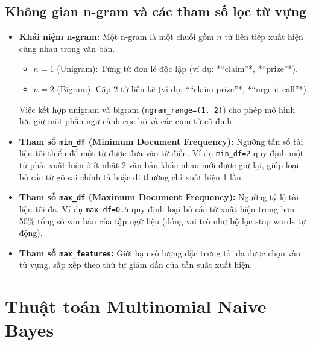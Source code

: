\subsection{Không gian n-gram và các tham số lọc từ vựng}
\begin{itemize}
    \item \textbf{Khái niệm n-gram:} Một n-gram là một chuỗi gồm $n$ từ liên tiếp xuất hiện cùng nhau trong văn bản.
    \begin{itemize}
        \item $n=1$ (Unigram): Từng từ đơn lẻ độc lập (ví dụ: *“claim”*, *“prize”*).
        \item $n=2$ (Bigram): Cặp 2 từ liền kề (ví dụ: *“claim prize”*, *“urgent call”*).
    \end{itemize}
    Việc kết hợp unigram và bigram (\texttt{ngram\_range=(1, 2)}) cho phép mô hình lưu giữ một phần ngữ cảnh cục bộ và các cụm từ cố định.
    \item \textbf{Tham số \texttt{min\_df} (Minimum Document Frequency):} Ngưỡng tần số tài liệu tối thiểu để một từ được đưa vào từ điển. Ví dụ \texttt{min\_df=2} quy định một từ phải xuất hiện ở ít nhất 2 văn bản khác nhau mới được giữ lại, giúp loại bỏ các từ gõ sai chính tả hoặc dị thường chỉ xuất hiện 1 lần.
    \item \textbf{Tham số \texttt{max\_df} (Maximum Document Frequency):} Ngưỡng tỷ lệ tài liệu tối đa. Ví dụ \texttt{max\_df=0.5} quy định loại bỏ các từ xuất hiện trong hơn 50\% tổng số văn bản của tập ngữ liệu (đóng vai trò như bộ lọc stop words tự động).
    \item \textbf{Tham số \texttt{max\_features}:} Giới hạn số lượng đặc trưng tối đa được chọn vào từ vựng, sắp xếp theo thứ tự giảm dần của tần suất xuất hiện.
\end{itemize}

\section{Thuật toán Multinomial Naive Bayes}
\label{sec:multinomial-nb}

